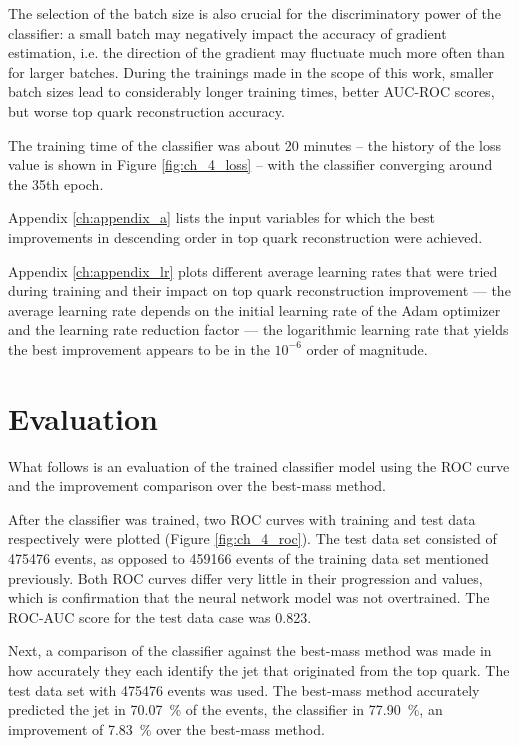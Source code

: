 The selection of the batch size is also crucial for the discriminatory power of the classifier: a small batch may negatively impact the accuracy of gradient estimation, i.e. the direction of the gradient may fluctuate much more often than for larger batches. During the trainings made in the scope of this work, smaller batch sizes lead to considerably longer training times, better AUC-ROC scores, but worse top quark reconstruction accuracy.

The training time of the classifier was about 20 minutes -- the history of the loss value is shown in Figure \ref{fig:ch_4_loss} -- with the classifier converging around the 35th epoch.

Appendix \ref{ch:appendix_a} lists the input variables for which the best improvements in descending order in top quark reconstruction were achieved.

Appendix \ref{ch:appendix_lr} plots different average learning rates that were tried during training and their impact on top quark reconstruction improvement --- the average learning rate depends on the initial learning rate of the Adam optimizer and the learning rate reduction factor --- the logarithmic learning rate that yields the best improvement appears to be in the $10^{-6}$ order of magnitude.

\section{Evaluation}
\label{sec:ch-4-eval}
What follows is an evaluation of the trained classifier model using the ROC curve and the improvement comparison over the best-mass method.

After the classifier was trained, two ROC curves with training and test data respectively were plotted (Figure \ref{fig:ch_4_roc}). The test data set consisted of \num{475476} events, as opposed to \num{459166} events of the training data set mentioned previously. Both ROC curves differ very little in their progression and values, which is confirmation that the neural network model was not overtrained. The ROC-AUC score for the test data case was 0.823.

Next, a comparison of the classifier against the best-mass method was made in how accurately they each identify the jet that originated from the top quark. The test data set with \num{475476} events was used. The best-mass method accurately predicted the jet in \SI{70.07}{\%} of the events, the classifier in \SI{77.90}{\%}, an improvement of \SI{7.83}{\%} over the best-mass method.

